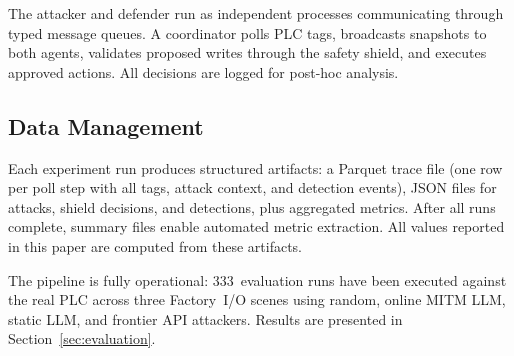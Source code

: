The attacker and defender run as independent processes communicating through typed message queues. A coordinator polls PLC tags, broadcasts snapshots to both agents, validates proposed writes through the safety shield, and executes approved actions. All decisions are logged for post-hoc analysis.

\subsection{Data Management}
\label{sec:impl:artifacts}

Each experiment run produces structured artifacts: a Parquet trace file (one row per poll step with all tags, attack context, and detection events), JSON files for attacks, shield decisions, and detections, plus aggregated metrics. After all runs complete, summary files enable automated metric extraction. All values reported in this paper are computed from these artifacts.

The pipeline is fully operational: 333~evaluation runs have been executed against the real PLC across three Factory~I/O scenes using random, online MITM LLM, static LLM, and frontier API attackers. Results are presented in Section~\ref{sec:evaluation}.